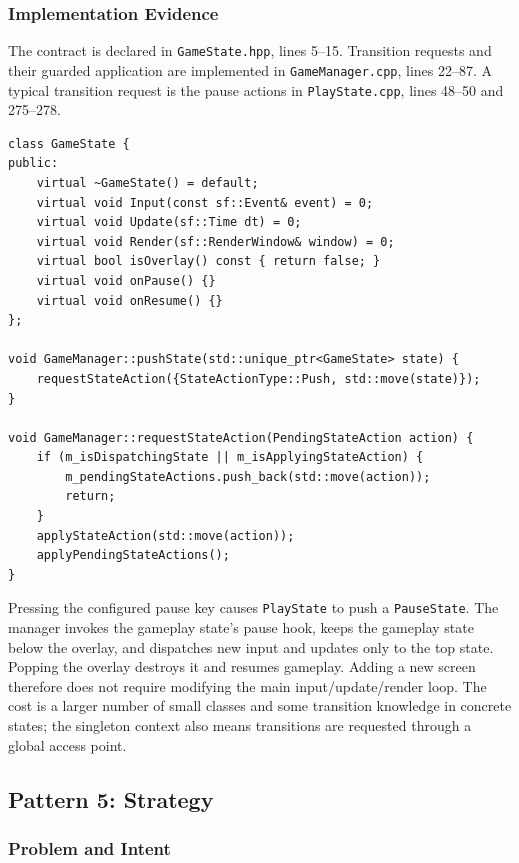 \documentclass{template}
\begin{document}
\subsubsection{Implementation Evidence}

The contract is declared in \texttt{GameState.hpp}, lines 5--15. Transition
requests and their guarded application are implemented in
\texttt{GameManager.cpp}, lines 22--87. A typical transition request is the
pause actions in \texttt{PlayState.cpp}, lines 48--50 and 275--278.

\begin{lstlisting}[style=gamecode,basicstyle=\ttfamily\scriptsize,caption={State contract and deferred transition request.}]
class GameState {
public:
    virtual ~GameState() = default;
    virtual void Input(const sf::Event& event) = 0;
    virtual void Update(sf::Time dt) = 0;
    virtual void Render(sf::RenderWindow& window) = 0;
    virtual bool isOverlay() const { return false; }
    virtual void onPause() {}
    virtual void onResume() {}
};

void GameManager::pushState(std::unique_ptr<GameState> state) {
    requestStateAction({StateActionType::Push, std::move(state)});
}

void GameManager::requestStateAction(PendingStateAction action) {
    if (m_isDispatchingState || m_isApplyingStateAction) {
        m_pendingStateActions.push_back(std::move(action));
        return;
    }
    applyStateAction(std::move(action));
    applyPendingStateActions();
}
\end{lstlisting}

Pressing the configured pause key causes \texttt{PlayState} to push a
\texttt{PauseState}. The manager invokes the gameplay state's pause hook, keeps the
gameplay state below the overlay, and dispatches new input and updates only to
the top state. Popping the overlay destroys it and resumes gameplay. Adding a
new screen therefore does not require modifying the main input/update/render
loop. The cost is a larger number of small classes and some transition
knowledge in concrete states; the singleton context also means transitions are
requested through a global access point.

\subsection{Pattern 5: Strategy}

\subsubsection{Problem and Intent}
\end{document}
